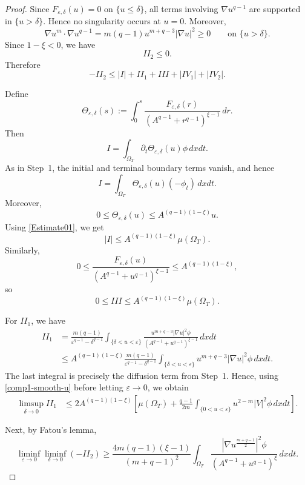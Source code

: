 \documentclass[10pt,a4paper]{amsart}
\begin{document}
\begin{proof}
Since $F_{\varepsilon,\delta}(u)=0$ on $\{u\le\delta\}$, all terms
involving $\nabla u^{q-1}$ are supported in $\{u>\delta\}$. Hence no
singularity occurs at $u=0$. Moreover,
\[
\nabla u^m\cdot\nabla u^{q-1}
=
m(q-1)u^{m+q-3}|\nabla u|^2
\ge0
\qquad\text{on }\{u>\delta\}.
\]
Since $1-\xi<0$, we have
\[
II_2\le0.
\]
Therefore
\begin{equation}\label{basic-smooth-u}
-II_2
\le
|I|+II_1+III+|IV_1|+|IV_2|.
\end{equation}

Define
\[
\Theta_{\varepsilon,\delta}(s)
:=
\int_0^s
\frac{F_{\varepsilon,\delta}(r)}
{\left(A^{q-1}+r^{q-1}\right)^{\xi-1}}
\,dr.
\]
Then
\[
I
=
\int_{\Omega_T}
\partial_t\Theta_{\varepsilon,\delta}(u)\phi\,dxdt.
\]
As in Step~1, the initial and terminal boundary terms vanish, and hence
\[
I
=
\int_{\Omega_T}
\Theta_{\varepsilon,\delta}(u)(-\phi_t)\,dxdt.
\]
Moreover,
\[
0\le
\Theta_{\varepsilon,\delta}(u)
\le
A^{(q-1)(1-\xi)}u.
\]
Using \eqref{Estimate01}, we get
\begin{equation}\label{I2-smooth-u}
|I|
\le
A^{(q-1)(1-\xi)}\mu(\Omega_T).
\end{equation}
Similarly,
\[
0\le
\frac{F_{\varepsilon,\delta}(u)}
{\left(A^{q-1}+u^{q-1}\right)^{\xi-1}}
\le
A^{(q-1)(1-\xi)},
\]
so
\begin{equation}\label{III2-smooth-u}
0\le III
\le
A^{(q-1)(1-\xi)}\mu(\Omega_T).
\end{equation}

For $II_1$, we have
\[
\begin{aligned}
II_1
&=
\frac{m(q-1)}
{\varepsilon^{q-1}-\delta^{q-1}}
\int_{\{\delta<u<\varepsilon\}}
\frac{
u^{m+q-3}|\nabla u|^2\phi
}
{\left(A^{q-1}+u^{q-1}\right)^{\xi-1}}
\,dxdt \\
&\le
A^{(q-1)(1-\xi)}
\frac{m(q-1)}
{\varepsilon^{q-1}-\delta^{q-1}}
\int_{\{\delta<u<\varepsilon\}}
u^{m+q-3}|\nabla u|^2\phi
\,dxdt.
\end{aligned}
\]
The last integral is precisely the diffusion term from Step~1. Hence, using
\eqref{comp1-smooth-u} before letting $\varepsilon\to0$, we obtain
\begin{equation}\label{II1-smooth-u}
\begin{aligned}
\limsup_{\delta\to0}II_1
&\le
2A^{(q-1)(1-\xi)}
\left[
\mu(\Omega_T)
+
\frac{q-1}{2m}
\int_{\{0<u<\varepsilon\}}
u^{2-m}|V|^2\phi\,dxdt
\right].
\end{aligned}
\end{equation}

Next, by Fatou's lemma,
\begin{equation}\label{II2-smooth-u}
\liminf_{\varepsilon\to0}
\liminf_{\delta\to0}
(-II_2) \ge
\frac{4m(q-1)(\xi-1)}
{(m+q-1)^2}
\int_{\Omega_T}
\frac{
\left|\nabla u^{\frac{m+q-1}{2}}\right|^2\phi
}
{\left(A^{q-1}+u^{q-1}\right)^\xi}
\,dxdt.
\end{equation}


\end{proof}
\end{document}
